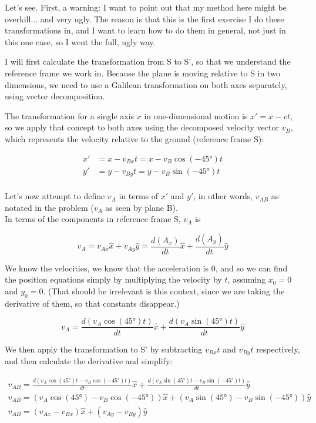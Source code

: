 \documentclass[8.01x]{subfiles}
\begin{document}
Let's see. First, a warning: I want to point out that my method here might be overkill... and very ugly. The reason is that this is the first exercise I do these transformations in, and I want to learn how to do them in general, not just in this one case, so I went the full, ugly way.

I will first calculate the transformation from S to S', so that we understand the reference frame we work in. Because the plane is moving relative to S in two dimensions, we need to use a Galilean transformation on both axes separately, using vector decomposition.

The transformation for a single axis $x$ in one-dimensional motion is $x' = x - v t$, so we apply that concept to both axes using the decomposed velocity vector $v_B$, which represents the velocity relative to the ground (reference frame S):

\begin{align}
x' &= x - v_{Bx} t = x - v_B \cos(-\ang{45}) t\\
y' &= y - v_{By} t = y - v_B \sin(-\ang{45}) t\\
\end{align}
	
Let's now attempt to define $v_A$ in terms of $x'$ and $y'$, in other words, $v_{AB}$ as notated in the problem ($v_A$ as seen by plane B).\\
In terms of the components in reference frame S, $v_A$ is

\begin{equation}
v_A = v_{Ax} \hat{x} + v_{Ay} \hat{y} = \frac{d(A_x)}{dt} \hat{x} + \frac{d(A_y)}{dt} \hat{y}
\end{equation}

We know the velocities, we know that the acceleration is 0, and so we can find the position equations simply by multiplying the velocity by $t$, assuming $x_0 = 0$ and $y_0 = 0$. (That should be irrelevant is this context, since we are taking the derivative of them, so that constants disappear.)

\begin{equation}
v_A = \frac{d(v_A \cos(\ang{45}) t)}{dt} \hat{x} + \frac{d(v_A \sin(\ang{45}) t)}{dt} \hat{y}
\end{equation}

We then apply the transformation to S' by subtracting $v_{Bx} t$ and $v_{By} t$ respectively, and then calculate the derivative and simplify:

\begin{align}
v_{AB} = \frac{d(v_A \cos(\ang{45}) t - v_B \cos(-\ang{45}) t)}{dt} \hat{x} + \frac{d(v_A \sin(\ang{45}) t - v_B \sin(-\ang{45}) t)}{dt} \hat{y}\\
v_{AB} = (v_A \cos(\ang{45}) - v_B \cos(-\ang{45})) \hat{x} + (v_A \sin(\ang{45}) - v_B \sin(-\ang{45})) \hat{y}\\
v_{AB} = (v_{Ax} - v_{Bx}) \hat{x} + (v_{Ay} - v_{By}) \hat{y}
\end{align}
\end{document}
